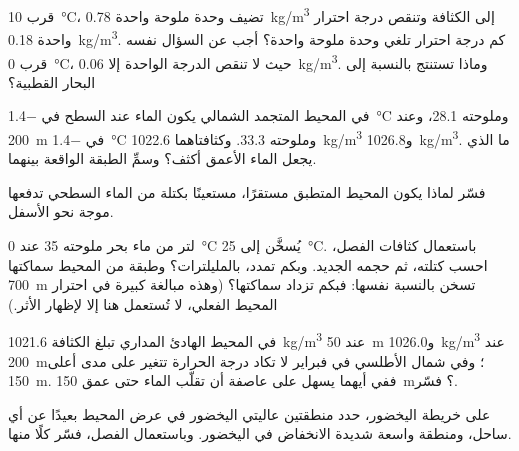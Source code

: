 \begin{exercise}[$\star\star$]\label{exo:g10:layered-ocean:9}
قرب \qty{10}{\degreeCelsius}، تضيف وحدة ملوحة واحدة
\qty{0.78}{kg/m^3} إلى الكثافة وتنقص درجة احترار واحدة
\qty{0.18}{kg/m^3}. كم درجة احترار تلغي وحدة ملوحة واحدة؟ أجب عن السؤال نفسه قرب
\qty{0}{\degreeCelsius}، حيث لا تنقص الدرجة الواحدة إلا \qty{0.06}{kg/m^3}. وماذا
تستنتج بالنسبة إلى البحار
القطبية؟
\end{exercise}

\begin{exercise}[$\star\star$]\label{exo:g10:layered-ocean:10}
في المحيط المتجمد الشمالي يكون الماء عند السطح في \qty{-1.4}{\degreeCelsius}
وملوحته 28.1، وعند \qty{200}{m} في \qty{-1.4}{\degreeCelsius}
وملوحته 33.3. وكثافتاهما \qty{1022.6}{kg/m^3}
و\qty{1026.8}{kg/m^3}. ما الذي يجعل الماء الأعمق أكثف؟ وسمِّ الطبقة
الواقعة بينهما.
\end{exercise}

\begin{exercise}[$\star\star$]\label{exo:g10:layered-ocean:11}
فسّر لماذا يكون المحيط المتطبق مستقرًا، مستعينًا بكتلة من الماء السطحي تدفعها موجة
نحو الأسفل.
\end{exercise}

\begin{exercise}[$\star\star\star$]\label{exo:g10:layered-ocean:12}
لتر من ماء بحر ملوحته 35 عند \qty{0}{\degreeCelsius} يُسخَّن إلى
\qty{25}{\degreeCelsius}. باستعمال كثافات الفصل، احسب كتلته، ثم حجمه الجديد. وبكم
تمدد، بالمليلترات؟ وطبقة من المحيط سماكتها \qty{700}{m} تسخن بالنسبة نفسها: فبكم
تزداد سماكتها؟ (وهذه مبالغة كبيرة في احترار المحيط الفعلي، لا تُستعمل هنا إلا
لإظهار الأثر.)
\end{exercise}

\begin{exercise}[$\star\star\star$]\label{exo:g10:layered-ocean:13}
في المحيط الهادئ المداري تبلغ الكثافة \qty{1021.6}{kg/m^3} عند \qty{50}{m}
و\qty{1026.0}{kg/m^3} عند \qty{200}{m}؛ وفي شمال الأطلسي في فبراير لا تكاد
درجة الحرارة تتغير على مدى أعلى \qty{150}{m}. ففي أيهما يسهل على عاصفة
أن تقلّب الماء حتى عمق \qty{150}{m}؟ فسّر.
\end{exercise}

\begin{exercise}[$\star\star\star$]\label{exo:g10:layered-ocean:14}
على خريطة اليخضور، حدد منطقتين عاليتي اليخضور في عرض المحيط بعيدًا عن أي ساحل،
ومنطقة واسعة شديدة الانخفاض في اليخضور. وباستعمال الفصل، فسّر كلًا
منها.
\end{exercise}

